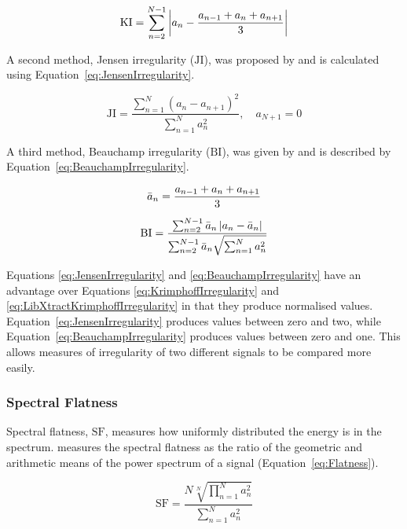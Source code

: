 			\begin{equation}
				\mathrm{KI} = \sum_{n = 2}^{N - 1}
						  \left|a_{n} - \frac{a_{n-1} + a_{n} + a_{n+1}}{3}\right|
				\label{eq:LibXtractKrimphoffIrregularity}
			\end{equation}

			A second method, Jensen irregularity ($\mathrm{JI}$), was proposed by \citet{jensen1999timbre} and
			is calculated using Equation~\ref{eq:JensenIrregularity}.

			\begin{equation}
				\mathrm{JI} = \frac{\sum_{n = 1}^{N} (a_{n} - a_{n+1})^{2}}
						   {\sum_{n = 1}^{N} a_{n}^{2}},
					      \quad a_{N+1} = 0
				\label{eq:JensenIrregularity}
			\end{equation}

			A third method, Beauchamp irregularity ($\mathrm{BI}$), was given by \citet{beauchamp2007analysis}
			and is described by Equation~\ref{eq:BeauchampIrregularity}.

			\begin{gather}
				\bar{a}_{n} = \frac{a_{n-1} + a_{n} + a_{n+1}}{3} \nonumber \\[0.6em]
				\mathrm{BI} = \frac{\sum_{n = 2}^{N - 1} \bar{a}_{n} \left|a_{n} - \bar{a}_{n}\right|}
						   {\sum_{n = 2}^{N - 1} \bar{a}_{n} \sqrt{\sum_{n = 1}^{N} a_{n}^{2}}}
				\label{eq:BeauchampIrregularity}
			\end{gather}

			Equations \ref{eq:JensenIrregularity} and \ref{eq:BeauchampIrregularity} have an advantage over
			Equations \ref{eq:KrimphoffIrregularity} and \ref{eq:LibXtractKrimphoffIrregularity} in that they
			produce normalised values. Equation~\ref{eq:JensenIrregularity} produces values between zero and
			two, while Equation~\ref{eq:BeauchampIrregularity} produces values between zero and one. This
			allows measures of irregularity of two different signals to be compared more easily.

		\subsubsection*{Spectral Flatness}
			Spectral flatness, $\mathrm{SF}$, measures how uniformly distributed the energy is in the spectrum.
			\citet{johnston1988transform} measures the spectral flatness as the ratio of the geometric and
			arithmetic means of the power spectrum of a signal (Equation~\ref{eq:Flatness}).

			\begin{equation}
				\mathrm{SF} = \frac{N\sqrt[N]{\prod_{n = 1}^{N} a_{n}^{2}}}
						   {\sum_{n = 1}^{N} a_{n}^{2}}
				\label{eq:Flatness}
			\end{equation}

